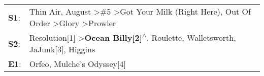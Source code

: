 \begin{supertabular}{p{0.03\textwidth}p{0.92\textwidth}}
 \textbf{S1}:  &  Thin Air\textsuperscript{}, \enspace August\textsuperscript{} \textgreater \enspace \#5\textsuperscript{} \textgreater \enspace Got Your Milk (Right Here)\textsuperscript{}, \enspace Out Of Order\textsuperscript{} \textgreater \enspace Glory\textsuperscript{} \textgreater \enspace Prowler\textsuperscript{}  \enspace  \\
 \textbf{S2}:  &                                                      Resolution[1]\textsuperscript{} \textgreater \enspace \textbf{Ocean Billy[2]\textsuperscript{$\wedge$}}, \enspace Roulette\textsuperscript{}, \enspace Walletsworth\textsuperscript{}, \enspace JaJunk[3]\textsuperscript{}, \enspace Higgins\textsuperscript{}  \enspace  \\
 \textbf{E1}:  &                                                                                                                                                                                                                                              Orfeo\textsuperscript{}, \enspace Mulche's Odyssey[4]\textsuperscript{}  \enspace  \\
\end{supertabular}
